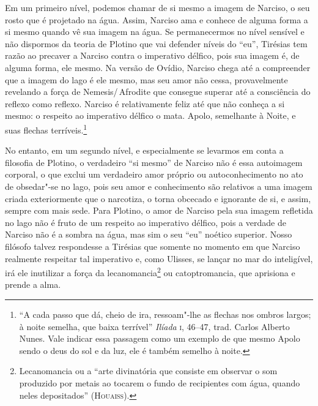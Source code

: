 Em um primeiro nível, podemos chamar de si mesmo a imagem de Narciso,
o seu rosto que é projetado na água. Assim, Narciso ama e conhece de
alguma forma a si mesmo quando vê sua imagem na água. Se
permanecermos no nível sensível e não dispormos da teoria de Plotino
que vai defender níveis do “eu”, Tirésias tem razão ao precaver a
Narciso contra o imperativo délfico, pois sua imagem é, de alguma
forma, ele mesmo. Na versão de Ovídio, Narciso chega até a
compreender que a imagem do lago é ele mesmo, mas seu amor não cessa,
provavelmente revelando a força de Nemesis/\,Afrodite que consegue
superar até a consciência do reflexo como reflexo.  Narciso é
relativamente feliz até que não conheça a si mesmo: o respeito ao
imperativo délfico o mata. Apolo, semelhante à Noite, e suas flechas
terríveis.\footnote{ “A cada passo que dá, cheio de ira, ressoam"-lhe
as flechas nos ombros largos; à noite semelha, que baixa
terrível”\emph{ Ilíada} \textsc{i}, 46--47, trad. Carlos Alberto Nunes. Vale
indicar essa passagem como um exemplo de que mesmo Apolo sendo o deus
do sol e da luz, ele é também semelho à noite.}

No entanto, em um segundo nível, e especialmente se levarmos em conta
a filosofia de Plotino, o verdadeiro “si mesmo” de Narciso não é essa
autoimagem corporal, o que exclui um verdadeiro amor próprio ou
autoconhecimento no ato de obsedar"-se no lago, pois seu amor e
conhecimento são relativos a uma imagem criada exteriormente que o
narcotiza, o torna obcecado e ignorante de si, e assim, sempre com
mais sede. Para Plotino, o amor de Narciso pela sua imagem refletida
no lago não é fruto de um respeito ao imperativo délfico, pois a
verdade de Narciso não é a sombra na água, mas sim o seu “eu” noético
superior. Nosso filósofo talvez respondesse a Tirésias que somente no
momento em que Narciso realmente respeitar tal imperativo e, como
Ulisses, se lançar no mar do inteligível, irá ele inutilizar a força da
lecanomancia\footnote{ Lecanomancia ou a “arte divinatória que consiste em
observar o som produzido por metais ao tocarem o fundo de recipientes
com água, quando neles depositados” (\textsc{Houaiss}).} ou 
catoptromancia, que aprisiona e prende a alma.  

